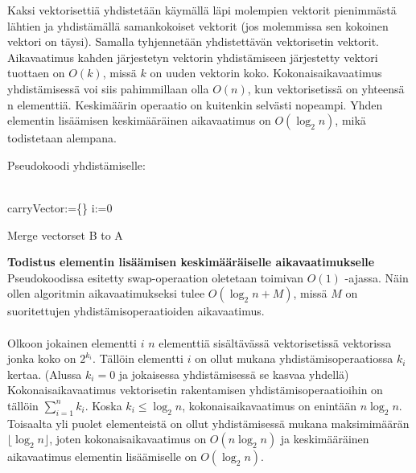 \documentclass{article}
\begin{document}
    Kaksi vektorisettiä yhdistetään käymällä läpi molempien vektorit pienimmästä lähtien ja yhdistämällä samankokoiset vektorit 
    (jos molemmissa sen kokoinen vektori on täysi). Samalla tyhjennetään yhdistettävän vektorisetin vektorit. Aikavaatimus kahden 
    järjestetyn vektorin yhdistämiseen järjestetty vektori tuottaen on $O(k)$, missä $k$ on uuden vektorin koko. Kokonaisaikavaatimus
    yhdistämisessä voi siis pahimmillaan olla $O(n)$, kun vektorisetissä on yhteensä n elementtiä. Keskimäärin operaatio on kuitenkin
    selvästi nopeampi. Yhden elementin lisäämisen keskimääräinen aikavaatimus on $O(\log_2 n)$, mikä todistetaan alempana.
    
    Pseudokoodi yhdistämiselle:
    \\ \\
    \begin{algorithm}[H]
        carryVector:=\{\}\;
        i:=0\;
        \caption{Merge vectorset B to A}
    \end{algorithm}
    
    \medskip \medskip
    \textbf{Todistus elementin lisäämisen keskimääräiselle aikavaatimukselle}
    Pseudokoodissa esitetty swap-operaation oletetaan toimivan $O(1)$ -ajassa. Näin ollen algoritmin aikavaatimukseksi tulee
    $O(\log_2 n + M)$, missä $M$ on suoritettujen yhdistämisoperaatioiden aikavaatimus.
    \\ \\
    Olkoon jokainen elementti $i$ $n$ elementtiä sisältävässä vektorisetissä vektorissa jonka koko on $2^{k_i}$. Tällöin
    elementti $i$ on ollut mukana yhdistämisoperaatiossa $k_i$ kertaa. (Alussa $k_i=0$ ja jokaisessa yhdistämisessä 
    se kasvaa yhdellä) Kokonaisaikavaatimus vektorisetin rakentamisen yhdistämisoperaatioihin on tällöin $\sum_{i=1}^n{k_i}$. 
    Koska $k_i\leq \log_2n$, kokonaisaikavaatimus on enintään $n\log_2n$. Toisaalta yli puolet elementeistä on ollut yhdistämisessä
    mukana maksimimäärän $\lfloor \log_2n \rfloor$, joten kokonaisaikavaatimus on $O(n\log_2n)$ ja keskimääräinen aikavaatimus elementin lisäämiselle 
    on $O(\log_2 n)$.
\end{document}
